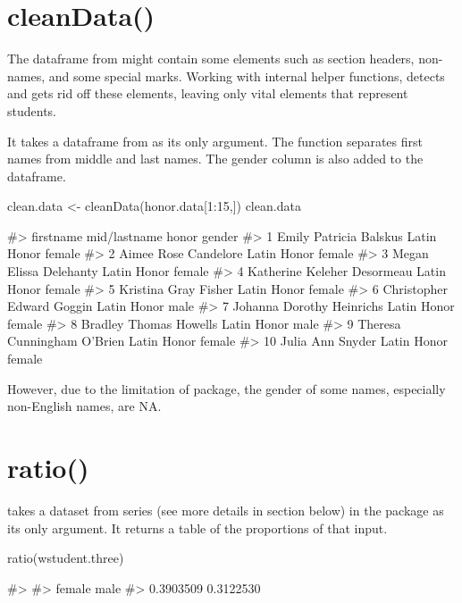 \section{cleanData()}\label{cleandata}

The dataframe from  might contain some elements
such as section headers, non-names, and some special marks. Working with
internal helper functions,  detects and gets rid off
these elements, leaving only vital elements that represent students.

It takes a dataframe from  as its only argument.
The function separates first names from middle and last names. The
gender column is also added to the dataframe.

\begin{Schunk}
\begin{Sinput}
clean.data <- cleanData(honor.data[1:15,])
clean.data
\end{Sinput}
\begin{Soutput}
#>      firstname       mid/lastname       honor gender
#> 1        Emily   Patricia Balskus Latin Honor female
#> 2        Aimee     Rose Candelore Latin Honor female
#> 3        Megan   Elissa Delehanty Latin Honor female
#> 4    Katherine  Keleher Desormeau Latin Honor female
#> 5     Kristina        Gray Fisher Latin Honor female
#> 6  Christopher      Edward Goggin Latin Honor   male
#> 7      Johanna  Dorothy Heinrichs Latin Honor female
#> 8      Bradley     Thomas Howells Latin Honor   male
#> 9      Theresa Cunningham O’Brien Latin Honor female
#> 10       Julia         Ann Snyder Latin Honor female
\end{Soutput}
\end{Schunk}

However, due to the limitation of  package, the gender of
some names, especially non-English names, are NA.

\section{ratio()}\label{ratio}

 takes a dataset from  series (see more
details in  section below) in the package as its only
argument. It returns a table of the proportions of that input.

\begin{Schunk}
\begin{Sinput}
ratio(wstudent.three)
\end{Sinput}
\begin{Soutput}
#> 
#>    female      male 
#> 0.3903509 0.3122530
\end{Soutput}
\end{Schunk}

